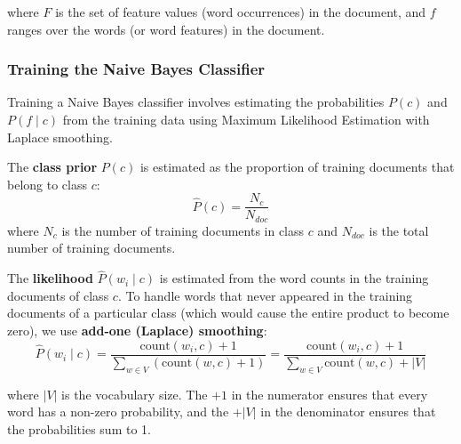 \documentclass[11pt,a4paper]{article}
\begin{document}
where $F$ is the set of feature values (word occurrences) in the document, and $f$ ranges over the words (or word features) in the document.

\subsubsection{Training the Naive Bayes Classifier}

Training a Naive Bayes classifier involves estimating the probabilities $P(c)$ and $P(f \mid c)$ from the training data using Maximum Likelihood Estimation with Laplace smoothing.

The \textbf{class prior} $P(c)$ is estimated as the proportion of training documents that belong to class $c$:
\[
\hat{P}(c) = \frac{N_c}{N_{doc}}
\]
where $N_c$ is the number of training documents in class $c$ and $N_{doc}$ is the total number of training documents.

The \textbf{likelihood} $\hat{P}(w_i \mid c)$ is estimated from the word counts in the training documents of class $c$. To handle words that never appeared in the training documents of a particular class (which would cause the entire product to become zero), we use \textbf{add-one (Laplace) smoothing}:
\[
\hat{P}(w_i \mid c) = \frac{\text{count}(w_i, c) + 1}{\sum_{w \in V} (\text{count}(w, c) + 1)} = \frac{\text{count}(w_i, c) + 1}{\sum_{w \in V} \text{count}(w, c) + |V|}
\]

where $|V|$ is the vocabulary size. The $+1$ in the numerator ensures that every word has a non-zero probability, and the $+|V|$ in the denominator ensures that the probabilities sum to 1.
\end{document}
